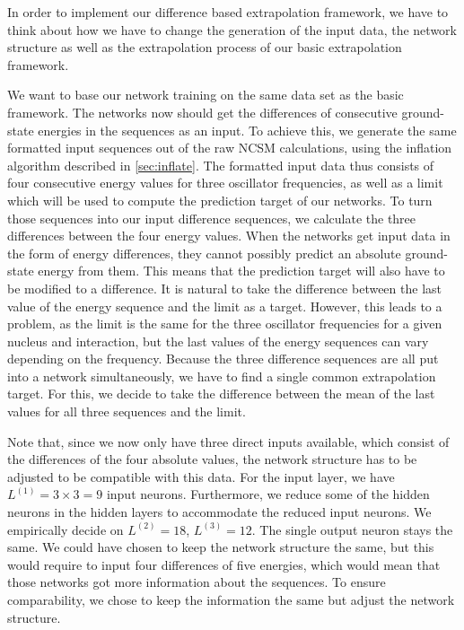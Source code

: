 In order to implement our difference based extrapolation framework, we have to think about how we have to change the generation of the input data, the network structure as well as the extrapolation process of our basic extrapolation framework.

We want to base our network training on the same data set as the basic framework. The networks now should get the differences of consecutive ground-state energies in the sequences as an input. To achieve this, we generate the same formatted input sequences out of the raw NCSM calculations, using the inflation algorithm described in \autoref{sec:inflate}. The formatted input data thus consists of four consecutive energy values for three oscillator frequencies, as well as a limit which will be used to compute the prediction target of our networks. To turn those sequences into our input difference sequences, we calculate the three differences between the four energy values. When the networks get input data in the form of energy differences, they cannot possibly predict an absolute ground-state energy from them. This means that the prediction target will also have to be modified to a difference. It is natural to take the difference between the last value of the energy sequence and the limit as a target. However, this leads to a problem, as the limit is the same for the three oscillator frequencies for a given nucleus and interaction, but the last values of the energy sequences can vary depending on the frequency. Because the three difference sequences are all put into a network simultaneously, we have to find a single common extrapolation target. For this, we decide to take the difference between the mean of the last values for all three sequences and the limit.

Note that, since we now only have three direct inputs available, which consist of the differences of the four absolute values, the network structure has to be adjusted to be compatible with this data. For the input layer, we have $L^{(1)} = 3 \times 3 = 9$ input neurons. Furthermore, we reduce some of the hidden neurons in the hidden layers to accommodate the reduced input neurons. We empirically decide on $L^{(2)} = 18$, $L^{(3)} = 12$. The single output neuron stays the same. We could have chosen to keep the network structure the same, but this would require to input four differences of five energies, which would mean that those networks got more information about the sequences. To ensure comparability, we chose to keep the information the same but adjust the network structure.

